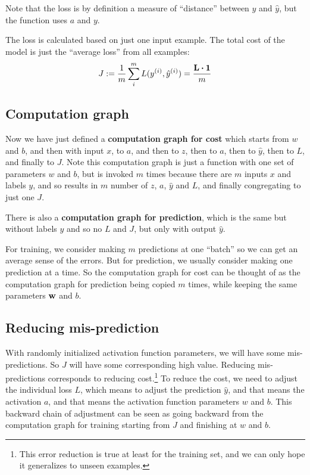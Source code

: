 \documentclass[11pt]{article}
\begin{document}
Note that the loss is by definition a measure of ``distance'' between $y$ and $\hat{y}$, but the function uses $a$ and $y$.

The loss is calculated based on just one input example.  The total cost of the model is just the ``average loss'' from all examples:
$$
J := \frac{1}{m} \sum_{i}^{m} L(y^{(i)}, \hat{y}^{(i)}) = \frac{\vb{L} \vdot \vb{1}}{m}
$$

\subsection{Computation graph}
Now we have just defined a \textbf{computation graph for cost} which starts from $w$ and $b$, and then with input $x$, to $a$, and then to $z$, then to $a$, then to $\hat{y}$, then to $L$, and finally to $J$.  Note this computation graph is just a function with one set of parameters $w$ and $b$, but is invoked $m$ times because there are $m$ inputs $x$ and labels $y$, and so results in $m$ number of $z$, $a$, $\hat{y}$ and $L$, and finally congregating to just one $J$.  

There is also a \textbf{computation graph for prediction}, which is the same but without labels $y$ and so no $L$ and $J$, but only with output $\hat{y}$. 

For training, we consider making $m$ predictions at one ``batch'' so we can get an average sense of the errors.  But for prediction, we usually consider making one prediction at a time.  So the computation graph for cost can be thought of as the computation graph for prediction being copied $m$ times, while keeping the same parameters $\vb{w}$ and $b$. 

\subsection{Reducing mis-prediction}
With randomly initialized activation function parameters, we will have some mis-predictions.  So $J$ will have some corresponding high value.  Reducing mis-predictions corresponds to reducing cost.\footnote{This error reduction is true at least for the training set, and we can only hope it generalizes to unseen examples.}  To reduce the cost, we need to adjust the individual loss $L$, which means to adjust the prediction $\hat{y}$, and that means the activation $a$, and that means the activation function parameters $w$ and $b$.  This backward chain of adjustment can be seen as going backward from the computation graph for training starting from $J$ and finishing at $w$ and $b$. 
\end{document}
